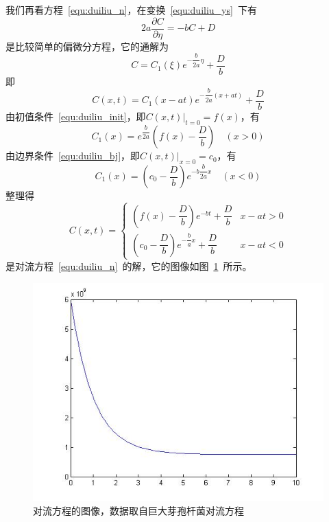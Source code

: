 \documentclass[a4paper,cs4size,adobefonts,fancyhdr]{ctexart}[2005/11/25]
\numberwithin{equation}{section} %
\begin{document}
我们再看方程~\ref{equ:duiliu_n}，在变换~\ref{equ:duiliu_ys}~下有
\begin{equation}
2a\dfrac{\partial C}{\partial \eta} = -bC+D
\end{equation}
是比较简单的偏微分方程，它的通解为
\begin{equation}
C=C_1(\xi)e^{-\dfrac{b}{2a}\eta}+\dfrac{D}{b}
\end{equation}
即
\begin{equation}
C(x,t)=C_1(x-at)e^{-\dfrac{b}{2a}(x+at)}+\dfrac{D}{b}
\end{equation}
由初值条件~\ref{equ:duiliu_init}，即$\left.C(x,t)\right|_{t=0}=f(x)$，有
\begin{equation}
C_1(x)=e^{\dfrac{b}{2a}}\left(f(x)-\dfrac{D}{b}\right)\quad(x>0)
\end{equation}
由边界条件~\ref{equ:duiliu_bj}，即$\left.C(x,t)\right|_{x=0}=c_0$，有
\begin{equation}
C_1(x)=\left(c_0-\dfrac{D}{b}\right)e^{-b\dfrac{b}{2a}x}\quad(x<0)
\end{equation}
整理得
\begin{equation}
C(x,t)=
\begin{cases}
\left(f(x)-\dfrac{D}{b}\right)e^{-bt}+\dfrac{D}{b}  & x-at>0 \\
\left(c_0-\dfrac{D}{b}\right)e^{-\dfrac{b}{a}x}+\dfrac{D}{b}	&x-at<0
\end{cases}
\end{equation}
是对流方程~\ref{equ:duiliu_n}~的解，它的图像如图~\ref{pic:duiliu_nnn}~所示。
\begin{figure}[ht]
\includegraphics[scale=0.6]{./pic/duiliu.jpg}
\caption{对流方程的图像，数据取自巨大芽孢杆菌对流方程}\label{pic:duiliu_nnn}
\end{figure}
\end{document}
